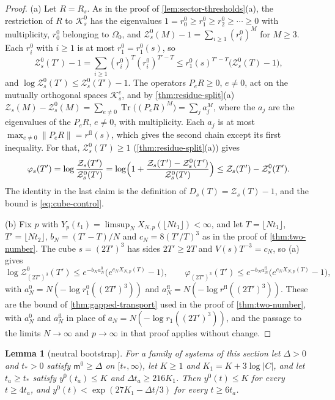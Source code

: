 \documentclass[11pt,a4paper]{amsart}
\newtheorem{lemma}[theorem]{Lemma}
\theoremstyle{definition}
\theoremstyle{remark}
\numberwithin{equation}{section}
\DeclareMathOperator{\Tr}{Tr}        %
\newcommand{\Kspace}{\mathcal{K}}    %
\newcommand{\norm}[1]{\lVert #1\rVert}     %
\newcommand{\abs}[1]{\lvert #1\rvert}      %
\newcommand{\TT}{\mathbb{T}}               %
\newcommand{\Zc}{\mathcal{Z}}              %
\newcommand{\Zs}[2]{\Zc_{#1}(#2)}          %
\newcommand{\Dexc}[2]{D_{#1}(#2)}          %
\newcommand{\Vol}[1]{V(#1)}                %
\newcommand{\cube}[1]{(2#1)^3}             %
\newcommand{\Omegazero}{\Omega_0}          %
\begin{document}
\begin{proof}
(a) Let $R=R_s$. As in the proof of \cref{lem:sector-thresholds}\textup{(a)}, the restriction of $R$ to $\Kspace^0_s$ has the eigenvalues $1=r^0_0\ge r^0_1\ge r^0_2\ge\cdots\ge0$ with multiplicity, $r^0_0$ belonging to $\Omegazero$, and $\Zc^0_s(M)-1=\sum_{i\ge1}(r^0_i)^M$ for $M\ge3$. Each $r^0_i$ with $i\ge1$ is at most $r^0_1=r_1^0(s)$, so
\[
\Zc^0_s(T')-1=\sum_{i\ge1}(r^0_i)^{T}(r^0_i)^{T'-T}\le r_1^0(s)^{T'-T}\bigl(\Zc^0_s(T)-1\bigr),
\]
and $\log\Zc^0_s(T')\le\Zc^0_s(T')-1$. The operators $P_eR\ge0$, $e\ne0$, act on the mutually orthogonal spaces $\Kspace^e_s$, and by \cref{thm:residue-split}\textup{(a)} $\Zs{s}{M}-\Zc^0_s(M)=\sum_{e\ne0}\Tr\bigl((P_eR)^M\bigr)=\sum_ja_j^M$, where the $a_j$ are the eigenvalues of the $P_eR$, $e\ne0$, with multiplicity. Each $a_j$ is at most $\max_{e\ne0}\norm{P_eR}=r^{\mathrm{fl}}(s)$, which gives the second chain except its first inequality. For that, $\Zc^0_s(T')\ge1$ (\cref{thm:residue-split}\textup{(a)}) gives
\[
\varphi_s(T')=\log\frac{\Zs{s}{T'}}{\Zc^0_s(T')}=\log\Bigl(1+\frac{\Zs{s}{T'}-\Zc^0_s(T')}{\Zc^0_s(T')}\Bigr)\le\Zs{s}{T'}-\Zc^0_s(T').
\]
The identity in the last claim is the definition of $\Dexc{s}{T}=\Zs{s}{T}-1$, and the bound is \eqref{eq:cube-control}.

(b) Fix $p$ with $Y_p(t_1)=\limsup_NX_{N,p}(\lfloor Nt_1\rfloor)<\infty$, and let $T=\lfloor Nt_1\rfloor$, $T'=\lfloor Nt_2\rfloor$, $b_N=(T'-T)/N$ and $c_N=8(T'/T)^3$ as in the proof of \cref{thm:two-number}. The cube $s=\cube{T'}$ has sides $2T'\ge2T$ and $\Vol{s}T^{-3}=c_N$, so (a) gives
\[
\log\Zc^0_{\cube{T'}}(T')\le e^{-b_Na^0_N}\bigl(e^{c_NX_{N,p}(T)}-1\bigr),\qquad \varphi_{\cube{T'}}(T')\le e^{-b_Na^{\mathrm{fl}}_N}\bigl(e^{c_NX_{N,p}(T)}-1\bigr),
\]
with $a^0_N=N(-\log r_1^0(\cube{T'}))$ and $a^{\mathrm{fl}}_N=N(-\log r^{\mathrm{fl}}(\cube{T'}))$. These are the bound of \cref{thm:gapped-transport} used in the proof of \cref{thm:two-number}, with $a^0_N$ and $a^{\mathrm{fl}}_N$ in place of $a_N=N(-\log r_1(\cube{T'}))$, and the passage to the limits $N\to\infty$ and $p\to\infty$ in that proof applies without change.
\end{proof}

\begin{lemma}[neutral bootstrap]\label{lem:neutral-bootstrap}
For a family of systems of this section let $\Delta>0$ and $t_*>0$ satisfy $\mathsf m^0\ge\Delta$ on $[t_*,\infty)$, let $K\ge1$ and $K_1=K+3\log\abs{C}$, and let $t_a\ge t_*$ satisfy $y^0(t_a)\le K$ and $\Delta t_a\ge216K_1$. Then $y^0(t)\le K$ for every $t\ge4t_a$, and $y^0(t)<\exp(27K_1-\Delta t/3)$ for every $t\ge6t_a$.
\end{lemma}
\end{document}
